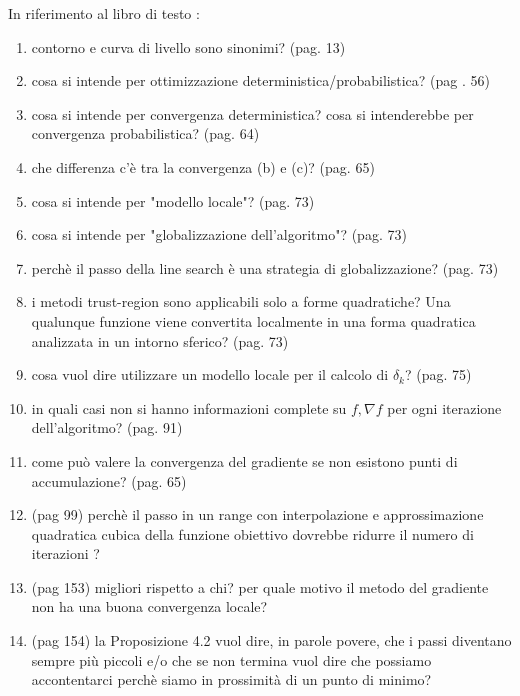 In riferimento al libro di testo \cite{grippo2011metodi}:

\begin{enumerate}

	\item contorno e curva di livello sono sinonimi? (pag. 13)

	\item cosa si intende per ottimizzazione deterministica/probabilistica? (pag . 56)

	\item cosa si intende per convergenza deterministica? cosa si intenderebbe per convergenza probabilistica? (pag. 64)

	\item che differenza c'è tra la convergenza (b) e (c)? (pag. 65)

	\item cosa si intende per "modello locale"? (pag. 73)

	\item cosa si intende per "globalizzazione dell'algoritmo"? (pag. 73)

	\item perchè il passo della line search è una strategia di globalizzazione? (pag. 73)

	\item i metodi trust-region sono applicabili solo a forme quadratiche? Una qualunque funzione viene convertita localmente in una forma quadratica analizzata in un intorno sferico? (pag. 73)

	\item cosa vuol dire utilizzare un modello locale per il calcolo di $\delta_{k}$? (pag. 75)

	\item in quali casi non si hanno informazioni complete su $f,\nabla f$ per ogni iterazione dell'algoritmo? (pag. 91)

	\item come può valere la convergenza del gradiente se non esistono punti di accumulazione? (pag. 65)

	\item (pag 99) perchè il passo in un range con interpolazione e approssimazione quadratica cubica della funzione obiettivo dovrebbe ridurre il numero di iterazioni ?

	\item (pag 153) migliori rispetto a chi? per quale motivo il metodo del gradiente non ha una buona convergenza locale?

	\item (pag 154) la Proposizione 4.2 vuol dire, in parole povere, che i passi diventano sempre più piccoli e/o che se non termina vuol dire che possiamo accontentarci perchè siamo in prossimità di un punto di minimo?


\end{enumerate}
